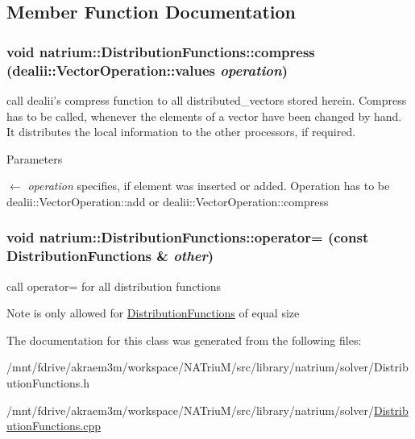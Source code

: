 \subsection{Member Function Documentation}
\hypertarget{classnatrium_1_1DistributionFunctions_a5b0afbafe841922dd3f949cc315b5533}{
\subsubsection[{compress}]{\setlength{\rightskip}{0pt plus 5cm}void natrium::DistributionFunctions::compress (dealii::VectorOperation::values {\em operation})}}
\label{classnatrium_1_1DistributionFunctions_a5b0afbafe841922dd3f949cc315b5533}


call dealii's compress function to all distributed\_\-vectors stored herein. Compress has to be called, whenever the elements of a vector have been changed by hand. It distributes the local information to the other processors, if required. 
\begin{DoxyParams}{Parameters}
\item[\mbox{$\leftarrow$} {\em operation}]specifies, if element was inserted or added. Operation has to be dealii::VectorOperation::add or dealii::VectorOperation::compress \end{DoxyParams}
\hypertarget{classnatrium_1_1DistributionFunctions_a5e61cb3ba258cf0958e1557061ed31b9}{
\subsubsection[{operator=}]{\setlength{\rightskip}{0pt plus 5cm}void natrium::DistributionFunctions::operator= (const {\bf DistributionFunctions} \& {\em other})}}
\label{classnatrium_1_1DistributionFunctions_a5e61cb3ba258cf0958e1557061ed31b9}


call operator= for all distribution functions \begin{DoxyNote}{Note}
is only allowed for \hyperlink{classnatrium_1_1DistributionFunctions}{DistributionFunctions} of equal size 
\end{DoxyNote}


The documentation for this class was generated from the following files:\begin{DoxyCompactItemize}
\item 
/mnt/fdrive/akraem3m/workspace/NATriuM/src/library/natrium/solver/DistributionFunctions.h\item 
/mnt/fdrive/akraem3m/workspace/NATriuM/src/library/natrium/solver/\hyperlink{DistributionFunctions_8cpp}{DistributionFunctions.cpp}\end{DoxyCompactItemize}
